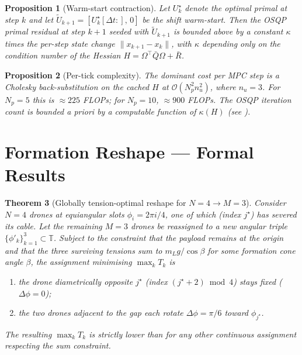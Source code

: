 \documentclass[11pt,a4paper]{article}
\theoremstyle{plain}
\newtheorem{theorem}{Theorem}
\newtheorem{proposition}[theorem]{Proposition}
\theoremstyle{definition}
\begin{document}
\begin{proposition}[Warm-start contraction]\label{prop:warmstart}
Let $U_k^\star$ denote the optimal primal at step $k$ and let
$\tilde U_{k+1} = [U_k^\star[\Delta t:],\,0]$ be the shift
warm-start. Then the OSQP primal residual at step $k+1$ seeded with
$\tilde U_{k+1}$ is bounded above by a constant $\kappa$ times the
per-step state change $\|x_{k+1} - x_k\|$, with $\kappa$ depending
only on the condition number of the Hessian $H = \Omega^\top \bar Q
\Omega + \bar R$.
\end{proposition}

\begin{proposition}[Per-tick complexity]\label{prop:complexity}
The dominant cost per MPC step is a Cholesky back-substitution on
the cached $H$ at $\mathcal O(N_p^2 n_u^2)$, where $n_u=3$. For
$N_p=5$ this is $\approx 225$ FLOPs; for $N_p=10$,
$\approx 900$ FLOPs. The OSQP iteration count is bounded a priori
by a computable function of $\kappa(H)$ (see \cite{OSQP}).
\end{proposition}

\section{Formation Reshape --- Formal Results}
\label{sec:reshape}

\begin{theorem}[Globally tension-optimal reshape for $N=4\to M=3$]\label{thm:reshape-optimality}
Consider $N=4$ drones at equiangular slots $\phi_i = 2\pi i/4$, one
of which (index $j^\star$) has severed its cable. Let the remaining
$M=3$ drones be reassigned to a new angular triple $\{\phi'_k\}_{k=1}^3
\subset \mathbb T$. Subject to the constraint that the payload remains
at the origin and that the three surviving tensions sum to
$m_L g/\cos\beta$ for some formation cone angle $\beta$, the
assignment minimising $\max_k T_k$ is
\begin{enumerate}
\item the drone diametrically opposite $j^\star$ (index
      $(j^\star + 2)\bmod 4$) stays fixed ($\Delta\phi = 0$);
\item the two drones adjacent to the gap each rotate
      $\Delta\phi = \pi/6$ toward $\phi_{j^\star}$.
\end{enumerate}
The resulting $\max_k T_k$ is strictly lower than for any other
continuous assignment respecting the sum constraint.
\end{theorem}
\end{document}
